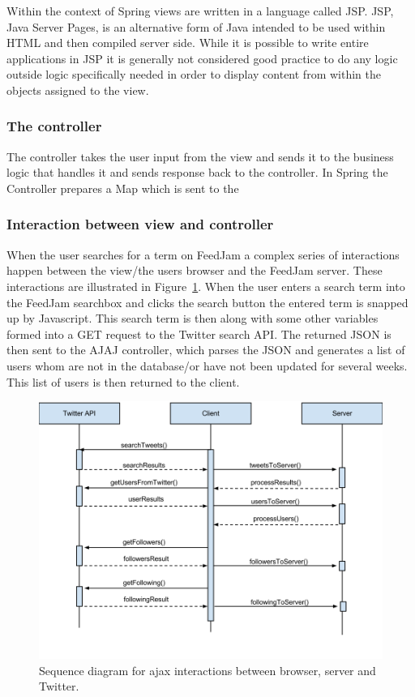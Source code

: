 Within the context of Spring views are written in a language called JSP. JSP, Java Server Pages, is an alternative form of Java intended to be used within HTML and then compiled server side. While it is possible to write entire applications in JSP it is generally not considered good practice to do any logic outside logic specifically needed in order to display content from within the objects assigned to the view.

\subsubsection{The controller}
The controller takes the user input from the view and sends it to the business logic that handles it and sends response back to the controller.
In Spring the Controller prepares a Map which is sent to the 

\subsubsection{Interaction between view and controller} %
\label{viewControllerInteraction}
When the user searches for a term on FeedJam a complex series of interactions happen between the view/the users browser and the FeedJam server. These interactions are illustrated in Figure~\ref{fig:AjaxInteractions}. When the user enters a search term into the FeedJam searchbox and clicks the search button the entered term is snapped up by Javascript. This search term is then along with some other variables formed into a GET request to the Twitter search API. The returned JSON is then sent to the AJAJ controller, which parses the JSON and generates a list of users whom are not in the database/or have not been updated for several weeks. This list of users is then returned to the client.

\begin{figure}[ht]
    \begin{minipage}[b]{1\linewidth}
        \centering
        \includegraphics[width=1\textwidth]{figures/sequencediagram}
        \caption{Sequence diagram for ajax interactions between browser, server and Twitter.}
        \label{fig:AjaxInteractions}
    \end{minipage}
\end{figure}

